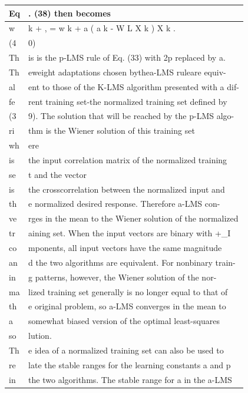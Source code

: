 {\def\LTcaptype{none} %
\begin{longtable}[]{@{}ll@{}}
\toprule\noalign{}
Eq & . (38) then becomes \\
\midrule\noalign{}
\endhead
\bottomrule\noalign{}
\endlastfoot
w & k + , = w k + a ( a k - W L X k ) X k . \\
(4 & 0) \\
Th & is is the p-LMS rule of Eq. (33) with 2p replaced by a. \\
Th & eweight adaptations chosen bythea-LMS ruleare equiv- \\
al & ent to those of the K-LMS algorithm presented with a dif- \\
fe & rent training set-the normalized training set defined by \\
(3 & 9). The solution that will be reached by the p-LMS algo- \\
ri & thm is the Wiener solution of this training set \\
wh & ere \\
is & the input correlation matrix of the normalized training \\
se & t and the vector \\
is & the crosscorrelation between the normalized input and \\
th & e normalized desired response. Therefore a-LMS con- \\
ve & rges in the mean to the Wiener solution of the normalized \\
tr & aining set. When the input vectors are binary with +\_I \\
co & mponents, all input vectors have the same magnitude \\
an & d the two algorithms are equivalent. For nonbinary train- \\
in & g patterns, however, the Wiener solution of the nor- \\
ma & lized training set generally is no longer equal to that of \\
th & e original problem, so a-LMS converges in the mean to \\
a & somewhat biased version of the optimal least-squares \\
so & lution. \\
Th & e idea of a normalized training set can also be used to \\
re & late the stable ranges for the learning constants a and p \\
in & the two algorithms. The stable range for a in the a-LMS \\

\end{longtable}}
